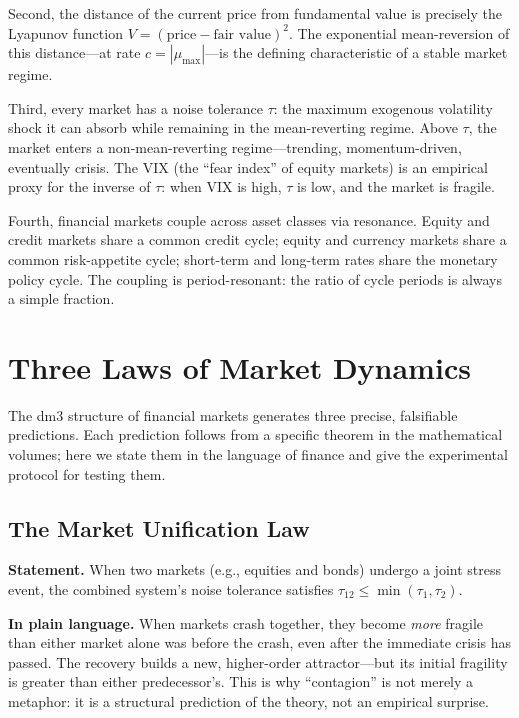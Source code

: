 \documentclass[12pt, oneside]{book}
\theoremstyle{plain}
\theoremstyle{definition}
\theoremstyle{remark}
\begin{document}
Second, the distance of the current price from fundamental value
is precisely the Lyapunov function $V = (\text{price} -
\text{fair value})^2$. The exponential mean-reversion of this
distance---at rate $c = |\mu_{\max}|$---is the defining
characteristic of a stable market regime.

Third, every market has a noise tolerance $\tau$: the maximum
exogenous volatility shock it can absorb while remaining in the
mean-reverting regime. Above $\tau$, the market enters a
non-mean-reverting regime---trending, momentum-driven, eventually
crisis. The VIX (the ``fear index'' of equity markets) is an
empirical proxy for the inverse of $\tau$: when VIX is high,
$\tau$ is low, and the market is fragile.

Fourth, financial markets couple across asset classes via
resonance. Equity and credit markets share a common credit cycle;
equity and currency markets share a common risk-appetite cycle;
short-term and long-term rates share the monetary policy cycle.
The coupling is period-resonant: the ratio of cycle periods
is always a simple fraction.

\section{Three Laws of Market Dynamics}

The dm3 structure of financial markets generates three precise,
falsifiable predictions. Each prediction follows from a specific
theorem in the mathematical volumes; here we state them
in the language of finance and give the experimental protocol
for testing them.

\subsection{The Market Unification Law}

\textbf{Statement.} When two markets (e.g., equities and bonds)
undergo a joint stress event, the combined system's noise tolerance
satisfies $\tau_{12} \leq \min(\tau_1, \tau_2)$.

\textbf{In plain language.} When markets crash together, they
become \emph{more} fragile than either market alone was before
the crash, even after the immediate crisis has passed. The
recovery builds a new, higher-order attractor---but its initial
fragility is greater than either predecessor's. This is why
``contagion'' is not merely a metaphor: it is a structural
prediction of the theory, not an empirical surprise.
\end{document}
